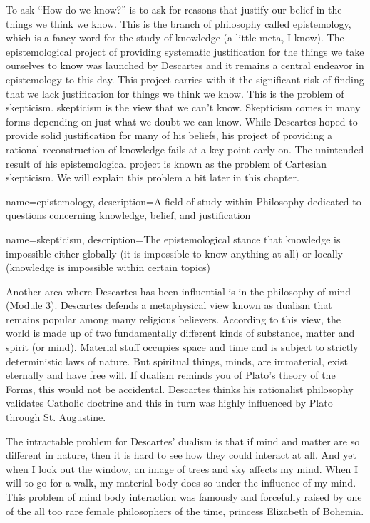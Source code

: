 To ask “How do we know?” is to ask for reasons that justify our belief in the things we think we know. This is the branch of philosophy called \Gls{epistemology}, which is a fancy word for the study of knowledge (a little meta, I know). The epistemological project of providing systematic justification for the things we take ourselves to know was launched by Descartes and it remains a central endeavor in epistemology to this day. This project carries with it the significant risk of finding that we lack justification for things we think we know. This is the problem of skepticism. \Gls{skepticism} is the view that we can’t know. Skepticism comes in many forms depending on just what we doubt we can know. While Descartes hoped to provide solid justification for many of his beliefs, his project of providing a rational reconstruction of knowledge fails at a key point early on. The unintended result of his epistemological project is known as the problem of Cartesian skepticism. We will explain this problem a bit later in this chapter.


{
name=epistemology,
description={A field of study within Philosophy dedicated to questions concerning knowledge, belief, and justification}
}

{
name=skepticism,
description={The epistemological stance that knowledge is impossible either globally (it is impossible to know anything at all) or locally (knowledge is impossible within certain topics)}
}



Another area where Descartes has been influential is in the philosophy of mind (Module 3). Descartes defends a metaphysical view known as dualism that remains popular among many religious believers. According to this view, the world is made up of two fundamentally different kinds of substance, matter and spirit (or mind). Material stuff occupies space and time and is subject to strictly deterministic laws of nature. But spiritual things, minds, are immaterial, exist eternally and have free will. If dualism reminds you of Plato’s theory of the Forms, this would not be accidental. Descartes thinks his rationalist philosophy validates Catholic doctrine and this in turn was highly influenced by Plato through St. Augustine.

The intractable problem for Descartes’ dualism is that if mind and matter are so different in nature, then it is hard to see how they could interact at all. And yet when I look out the window, an image of trees and sky affects my mind. When I will to go for a walk, my material body does so under the influence of my mind. This problem of mind body interaction was famously and forcefully raised by one of the all too rare female philosophers of the time, princess Elizabeth of Bohemia.

